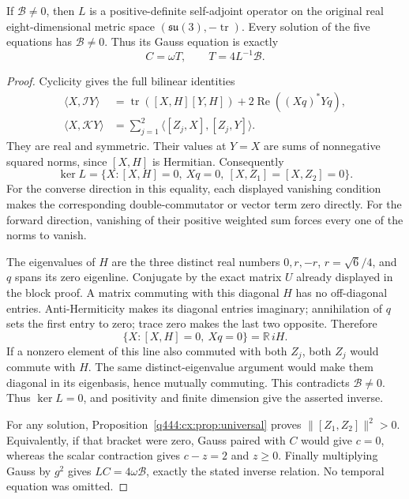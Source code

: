 \begin{lemma}
\label{q444:complex-gauss-inverse}
If $\mathscr B\ne0$, then $L$ is a positive-definite self-adjoint
operator on the original real eight-dimensional metric space
$(\mathfrak{su}(3),-\operatorname{tr})$. Every solution of the five
equations has $\mathscr B\ne0$. Thus its Gauss equation is exactly
\[
 C=\omega T,\qquad T=4L^{-1}\mathscr B.
\]
\end{lemma}
\begin{proof}
Cyclicity gives the full bilinear identities
\begin{align*}
 \langle X,\mathcal IY\rangle
 &=\operatorname{tr}([X,H][Y,H])
                    +2\operatorname{Re}((Xq)^*Yq),\\
 \langle X,\mathcal KY\rangle
 &=\sum_{j=1}^2\langle[Z_j,X],[Z_j,Y]\rangle.
\end{align*}
They are real and symmetric. Their values at $Y=X$ are sums of
nonnegative squared norms, since $[X,H]$ is Hermitian. Consequently
\[
 \ker L=\{X:[X,H]=0,\ Xq=0,\ [X,Z_1]=[X,Z_2]=0\}.
\]
For the converse direction in this equality, each displayed vanishing
condition makes the corresponding double-commutator or vector term
zero directly. For the forward direction, vanishing of their positive
weighted sum forces every one of the norms to vanish.

The eigenvalues of $H$ are the three distinct real numbers $0,r,-r$,
$r=\sqrt6/4$, and $q$ spans its zero eigenline. Conjugate by the exact
matrix $U$ already displayed in the block proof. A matrix commuting with
this diagonal $H$ has no off-diagonal entries. Anti-Hermiticity makes
its diagonal entries imaginary; annihilation of $q$ sets the first
entry to zero; trace zero makes the last two opposite. Therefore
\[
 \{X:[X,H]=0,\ Xq=0\}=\mathbb R\,iH.
\]
If a nonzero element of this line also commuted with both $Z_j$,
both $Z_j$ would commute with $H$. The same distinct-eigenvalue
argument would make them diagonal in its eigenbasis, hence mutually
commuting. This contradicts $\mathscr B\ne0$. Thus $\ker L=0$,
and positivity and finite dimension give the asserted inverse.

For any solution, Proposition~\ref{q444:cx:prop:universal} proves
$\|[Z_1,Z_2]\|^2>0$. Equivalently, if that bracket were zero,
Gauss paired with $C$ would give $c=0$, whereas the scalar contraction
gives $c-z=2$ and $z\geq0$. Finally multiplying Gauss by $g^2$
gives $LC=4\omega\mathscr B$, exactly the stated inverse relation.
No temporal equation was omitted.
\end{proof}

